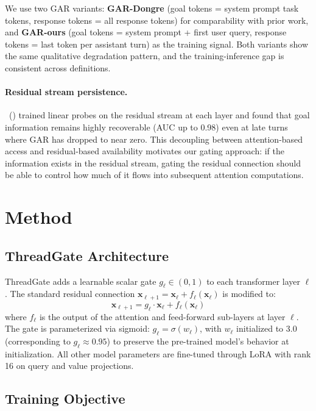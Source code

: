\documentclass[11pt,a4paper]{article}
\newcommand{\citet}[1]{\citeauthor{#1}~(\citeyear{#1})}
\begin{document}
We use two GAR variants: \textbf{GAR-Dongre} (goal tokens = system prompt task tokens, response tokens = all response tokens) for comparability with prior work, and \textbf{GAR-ours} (goal tokens = system prompt + first user query, response tokens = last token per assistant turn) as the training signal. Both variants show the same qualitative degradation pattern, and the training-inference gap is consistent across definitions.

\paragraph{Residual stream persistence.}
\citet{dongre2026} trained linear probes on the residual stream at each layer and found that goal information remains highly recoverable (AUC up to 0.98) even at late turns where GAR has dropped to near zero. This decoupling between attention-based access and residual-based availability motivates our gating approach: if the information exists in the residual stream, gating the residual connection should be able to control how much of it flows into subsequent attention computations.

\section{Method}

\subsection{ThreadGate Architecture}

ThreadGate adds a learnable scalar gate $g_\ell \in (0, 1)$ to each transformer layer $\ell$. The standard residual connection $\mathbf{x}_{\ell+1} = \mathbf{x}_\ell + f_\ell(\mathbf{x}_\ell)$ is modified to:
\begin{equation}
\mathbf{x}_{\ell+1} = g_\ell \cdot \mathbf{x}_\ell + f_\ell(\mathbf{x}_\ell)
\end{equation}
where $f_\ell$ is the output of the attention and feed-forward sub-layers at layer $\ell$. The gate is parameterized via sigmoid: $g_\ell = \sigma(w_\ell)$, with $w_\ell$ initialized to 3.0 (corresponding to $g_\ell \approx 0.95$) to preserve the pre-trained model's behavior at initialization. All other model parameters are fine-tuned through LoRA \cite{hu2022lora} with rank 16 on query and value projections.

\subsection{Training Objective}
\end{document}
